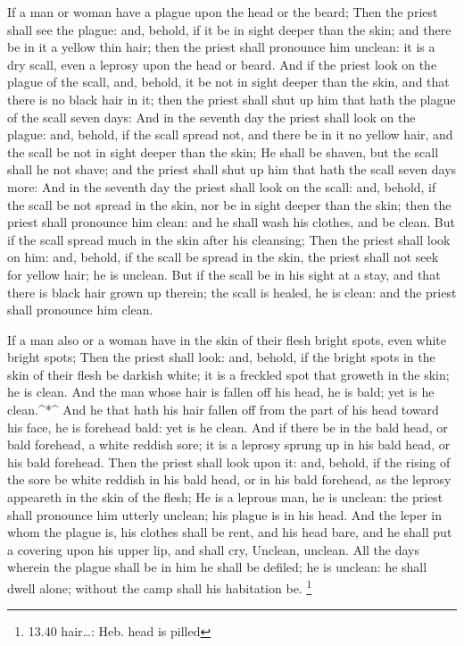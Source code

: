  If a man or woman have a plague upon the head or the
beard;  Then the priest shall see the plague: and, behold,
if it be in sight deeper than the skin; and there be in it a yellow thin
hair; then the priest shall pronounce him unclean: it is a dry scall,
even a leprosy upon the head or beard.  And if the priest
look on the plague of the scall, and, behold, it be not in sight deeper
than the skin, and that there is no black hair in it; then the priest
shall shut up him that hath the plague of the scall seven days:
 And in the seventh day the priest shall look on the
plague: and, behold, if the scall spread not, and there be in it no
yellow hair, and the scall be not in sight deeper than the skin;
 He shall be shaven, but the scall shall he not shave; and
the priest shall shut up him that hath the scall seven days more:
 And in the seventh day the priest shall look on the scall:
and, behold, if the scall be not spread in the skin, nor be in sight
deeper than the skin; then the priest shall pronounce him clean: and he
shall wash his clothes, and be clean.  But if the scall
spread much in the skin after his cleansing;  Then the
priest shall look on him: and, behold, if the scall be spread in the
skin, the priest shall not seek for yellow hair; he is unclean.
 But if the scall be in his sight at a stay, and that there
is black hair grown up therein; the scall is healed, he is clean: and
the priest shall pronounce him clean.

 If a man also or a woman have in the skin of their flesh
bright spots, even white bright spots;  Then the priest
shall look: and, behold, if the bright spots in the skin of their flesh
be darkish white; it is a freckled spot that groweth in the skin; he is
clean.  And the man whose hair is fallen off his head, he
is bald; yet is he clean.\^{}*\^{}  And he that hath his
hair fallen off from the part of his head toward his face, he is
forehead bald: yet is he clean.  And if there be in the
bald head, or bald forehead, a white reddish sore; it is a leprosy
sprung up in his bald head, or his bald forehead.  Then the
priest shall look upon it: and, behold, if the rising of the sore be
white reddish in his bald head, or in his bald forehead, as the leprosy
appeareth in the skin of the flesh;  He is a leprous man,
he is unclean: the priest shall pronounce him utterly unclean; his
plague is in his head.  And the leper in whom the plague
is, his clothes shall be rent, and his head bare, and he shall put a
covering upon his upper lip, and shall cry, Unclean, unclean.
 All the days wherein the plague shall be in him he shall
be defiled; he is unclean: he shall dwell alone; without the camp shall
his habitation be. \footnote{13.40 hair\ldots: Heb. head is pilled}

